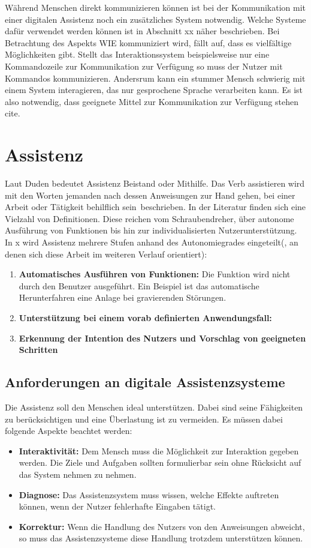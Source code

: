 Während Menschen direkt kommunizieren können ist bei der Kommunikation mit einer digitalen Assistenz noch ein zusätzliches System notwendig. Welche Systeme dafür verwendet werden können ist in Abschnitt xx näher beschrieben. Bei Betrachtung des Aspekts WIE kommuniziert wird, fällt auf, dass es vielfältige Möglichkeiten gibt. Stellt das Interaktionssystem beispielsweise nur eine Kommandozeile zur Kommunikation zur Verfügung so muss der Nutzer mit Kommandos kommunizieren. Andersrum kann ein stummer Mensch schwierig mit einem System interagieren, das nur gesprochene Sprache verarbeiten kann. Es ist also notwendig, dass geeignete Mittel zur Kommunikation zur Verfügung stehen cite.

\section{Assistenz}
Laut Duden bedeutet Assistenz Beistand oder Mithilfe. Das Verb assistieren wird mit den Worten \glqq jemanden nach dessen Anweisungen zur Hand gehen, bei einer Arbeit oder Tätigkeit behilflich sein\grqq \ beschrieben. In der Literatur finden sich eine Vielzahl von Definitionen. Diese reichen vom Schraubendreher, über autonome Ausführung von Funktionen bis hin zur individualisierten Nutzerunterstützung. In x wird Assistenz mehrere Stufen anhand des Autonomiegrades eingeteilt(, an denen sich diese Arbeit im weiteren Verlauf orientiert):
\begin{enumerate}
\item \textbf{Automatisches Ausführen von Funktionen:} Die Funktion wird nicht durch den Benutzer ausgeführt. Ein Beispiel ist das automatische Herunterfahren eine Anlage bei gravierenden Störungen.
\item \textbf{Unterstützung bei einem vorab definierten Anwendungsfall:}
\item \textbf{Erkennung der Intention des Nutzers und Vorschlag von geeigneten Schritten}
\end{enumerate}

\subsection{Anforderungen an digitale Assistenzsysteme}
Die Assistenz soll den Menschen ideal unterstützen. Dabei sind seine Fähigkeiten zu berücksichtigen und eine Überlastung ist zu vermeiden. Es müssen dabei folgende Aspekte beachtet werden:
\begin{itemize}
\item \textbf{Interaktivität:} Dem Mensch muss die Möglichkeit zur Interaktion gegeben werden. Die Ziele und Aufgaben sollten formulierbar sein ohne Rücksicht auf das System nehmen zu nehmen.
\item \textbf{Diagnose:} Das Assistenzsystem muss wissen, welche Effekte auftreten können, wenn der Nutzer fehlerhafte Eingaben tätigt.
\item \textbf{Korrektur:} Wenn die Handlung des Nutzers von den Anweisungen abweicht, so muss das Assistenzsysteme diese Handlung trotzdem unterstützen können.
\end{itemize}

